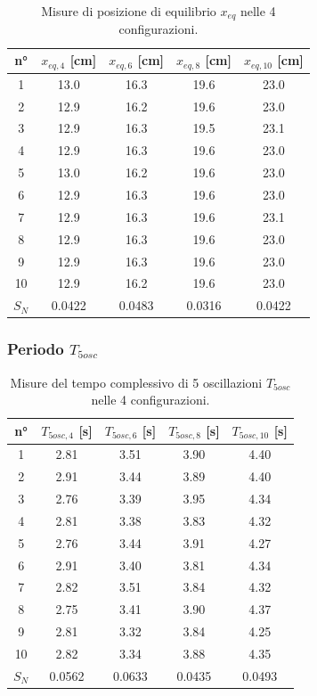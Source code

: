 \documentclass[titlepage]{article}
\numberwithin{equation}{section}
\numberwithin{figure}{section}
\numberwithin{table}{section}
\begin{document}
\begin{table}[ht]
  \centering
  \begin{tabular}{ccccc}
    \toprule
    n° & $x_{eq,4}$ [\si{\centi\metre}] & $x_{eq,6}$ [\si{\centi\metre}] & $x_{eq,8}$ [\si{\centi\metre}] & $x_{eq,10}$ [\si{\centi\metre}] \\
    \midrule
    1  & 13.0 & 16.3 & 19.6 & 23.0 \\
    2  & 12.9 & 16.2 & 19.6 & 23.0 \\
    3  & 12.9 & 16.3 & 19.5 & 23.1 \\
    4  & 12.9 & 16.3 & 19.6 & 23.0 \\
    5  & 13.0 & 16.2 & 19.6 & 23.0 \\
    6  & 12.9 & 16.3 & 19.6 & 23.0 \\
    7  & 12.9 & 16.3 & 19.6 & 23.1 \\
    8  & 12.9 & 16.3 & 19.6 & 23.0 \\
    9  & 12.9 & 16.3 & 19.6 & 23.0 \\
    10 & 12.9 & 16.2 & 19.6 & 23.0 \\
    \midrule
    $S_N$ & 0.0422 & 0.0483 & 0.0316 & 0.0422 \\
    \bottomrule
  \end{tabular}
  \caption{Misure di posizione di equilibrio $x_{eq}$ nelle 4 configurazioni.}
\end{table}

\pagebreak
\subsubsection{Periodo \texorpdfstring{$T_{5osc}$}{T5osc}}

\begin{table}[ht]
  \centering
  \begin{tabular}{ccccc}
    \toprule
    n° & $T_{5osc,4}$ [\si{\second}] & $T_{5osc,6}$ [\si{\second}] & $T_{5osc,8}$ [\si{\second}] & $T_{5osc,10}$ [\si{\second}] \\
    \midrule
    1  & 2.81 & 3.51 & 3.90 & 4.40 \\
    2  & 2.91 & 3.44 & 3.89 & 4.40 \\
    3  & 2.76 & 3.39 & 3.95 & 4.34 \\
    4  & 2.81 & 3.38 & 3.83 & 4.32 \\
    5  & 2.76 & 3.44 & 3.91 & 4.27 \\
    6  & 2.91 & 3.40 & 3.81 & 4.34 \\
    7  & 2.82 & 3.51 & 3.84 & 4.32 \\
    8  & 2.75 & 3.41 & 3.90 & 4.37 \\
    9  & 2.81 & 3.32 & 3.84 & 4.25 \\
    10 & 2.82 & 3.34 & 3.88 & 4.35 \\
    \midrule
    $S_N$ & 0.0562 & 0.0633 & 0.0435 & 0.0493 \\
    \hline
  \end{tabular}
  \caption{Misure del tempo complessivo di 5 oscillazioni $T_{5osc}$ nelle 4 configurazioni.}
\end{table}
\end{document}
